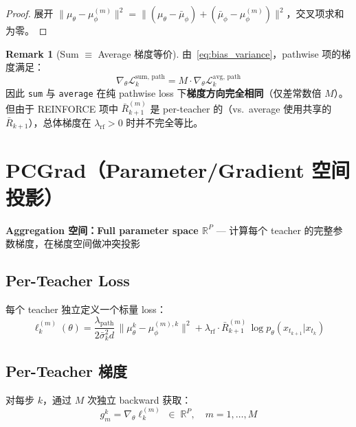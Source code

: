 \documentclass[11pt,a4paper]{article}
\newcommand{\loss}{\mathcal{L}}
\newcommand{\R}{\mathbb{R}}
\newcommand{\mutheta}{\mu_\theta}
\newcommand{\muphi}{\mu_\phi}
\newcommand{\mubar}{\bar{\mu}_\phi}
\newcommand{\sigbar}{\bar{\sigma}}
\newcommand{\Rbar}{\bar{R}}
\newcommand{\lpath}{\lambda_{\mathrm{path}}}
\newcommand{\lrf}{\lambda_{\mathrm{rf}}}
\theoremstyle{definition}
\newtheorem{remark}{Remark}
\begin{document}
\begin{proof}
展开 $\|\mutheta - \muphi^{(m)}\|^2 = \|(\mutheta - \mubar) + (\mubar - \muphi^{(m)})\|^2$，交叉项求和为零。
\end{proof}

\begin{remark}[Sum $\equiv$ Average 梯度等价]
由~\eqref{eq:bias_variance}，pathwise 项的梯度满足：
\begin{equation}
\nabla_\theta \loss_k^{\mathrm{sum,\,path}} = M \cdot \nabla_\theta \loss_k^{\mathrm{avg,\,path}}
\end{equation}
因此 \texttt{sum} 与 \texttt{average} 在纯 pathwise loss 下\textbf{梯度方向完全相同}（仅差常数倍 $M$）。但由于 REINFORCE 项中 $\Rbar_{k+1}^{(m)}$ 是 per-teacher 的（vs.\ average 使用共享的 $\Rbar_{k+1}$），总体梯度在 $\lrf > 0$ 时并不完全等比。
\end{remark}

\section{PCGrad（Parameter/Gradient 空间投影）}
\label{sec:pcgrad}

\begin{tcolorbox}[colback=red!5, colframe=red!50]
\textbf{Aggregation 空间：Full parameter space $\R^P$} — 计算每个 teacher 的完整参数梯度，在梯度空间做冲突投影
\end{tcolorbox}

\subsection{Per-Teacher Loss}

每个 teacher 独立定义一个标量 loss：
\begin{equation}
\ell_k^{(m)}(\theta) = \frac{\lpath}{2\sigbar_k^2 d}\,\|\mutheta^k - \muphi^{(m),k}\|^2
+ \lrf \cdot \Rbar_{k+1}^{(m)}\,\log p_\theta(x_{t_{k+1}}|x_{t_k})
\label{eq:per_teacher_loss}
\end{equation}

\subsection{Per-Teacher 梯度}

对每步 $k$，通过 $M$ 次独立 backward 获取：
\begin{equation}
g_m^k = \nabla_\theta \ell_k^{(m)} \;\in\; \R^P, \quad m = 1,\ldots,M
\end{equation}
\end{document}

